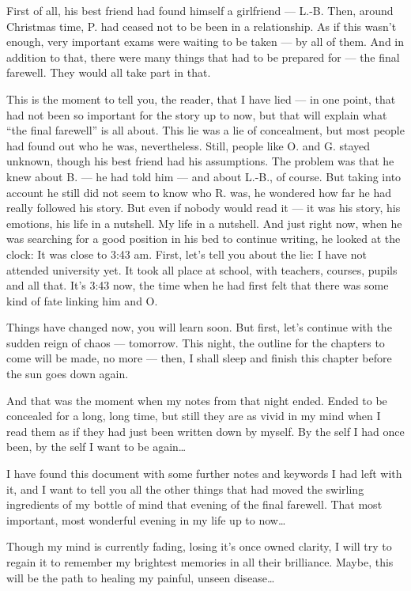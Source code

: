 First of all, his best friend had found himself a girlfriend --- L.-B. Then, around Christmas time, P. had ceased not to be been in a relationship. As if this wasn't enough, very important exams were waiting to be taken --- by all of them. And in addition to that, there were many things that had to be prepared for --- the final farewell. They would all take part in that.

This is the moment to tell you, the reader, that I have lied --- in one point, that had not been so important for the story up to now, but that will explain what \enquote{the final farewell} is all about. This lie was a lie of concealment, but most people had found out who he was, nevertheless. Still, people like O. and G. stayed unknown, though his best friend had his assumptions. The problem was that he knew about B. --- he had told him --- and about L.-B., of course. But taking into account he still did not seem to know who R. was, he wondered how far he had really followed his story. But even if nobody would read it --- it was his story, his emotions, his life in a nutshell. My life in a nutshell. And just right now, when he was searching for a good position in his bed to continue writing, he looked at the clock: It was close to 3:43 am. First, let's tell you about the lie: I have not attended university yet. It took all place at school, with teachers, courses, pupils and all that. It's 3:43 now, the time when he had first felt that there was some kind of fate linking him and O.

Things have changed now, you will learn soon. But first, let's continue with the sudden reign of chaos --- tomorrow. This night, the outline for the chapters to come will be made, no more --- then, I shall sleep and finish this chapter before the sun goes down again.

And that was the moment when my notes from that night ended. Ended to be concealed for a long, long time, but still they are as vivid in my mind when I read them as if they had just been written down by myself. By the self I had once been, by the self I want to be again\dots{}

I have found this document with some further notes and keywords I had left with it, and I want to tell you all the other things that had moved the swirling ingredients of my bottle of mind that evening of the final farewell. That most important, most wonderful evening in my life up to now\dots{}

Though my mind is currently fading, losing it's once owned clarity, I will try to regain it to remember my brightest memories in all their brilliance. Maybe, this will be the path to healing my painful, unseen disease\dots{}

